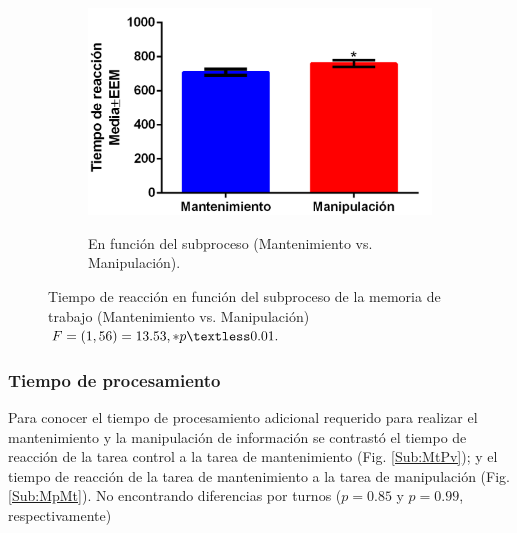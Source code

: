 \documentclass[12pt,letterpaper,final]{article}
\begin{document}
\begin{figure}[h]
\begin{footnotesize}
	\begin{subfigure}[b]{0.9\textwidth}	
	\centering
	\caption{En función del subproceso (Mantenimiento vs. Manipulación).}
	\includegraphics[scale=0.8]{graficas/RT_Tar.png}
	\label{Sub:rttar}
	\end{subfigure}
 \end{footnotesize}
	\caption{Tiempo de reacción en función del subproceso de la memoria de trabajo (Mantenimiento vs. Manipulación) $F=(1,56)= 13.53, *p\textless0.01.$}
	\label{fig:rt}
\end{figure}


 
\subsubsection{Tiempo de procesamiento}
Para conocer el tiempo de procesamiento adicional requerido para realizar el mantenimiento y la manipulación de información se contrastó el tiempo de reacción de la tarea control a la tarea de mantenimiento (Fig. \ref{Sub:MtPv}); y el tiempo de reacción de la tarea de mantenimiento a la tarea de manipulación (Fig. \ref{Sub:MpMt}). No encontrando diferencias por turnos ($p=0.85$ y $p=0.99$, respectivamente)
\end{document}
